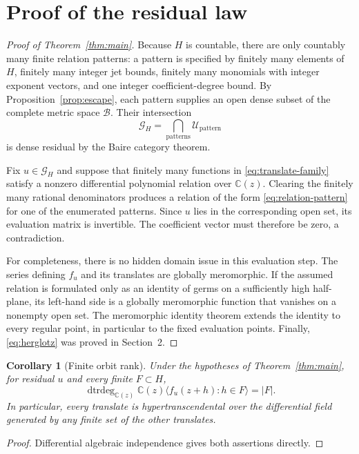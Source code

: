 \documentclass[11pt]{article}
\newtheorem{corollary}[theorem]{Corollary}
\newcommand{\C}{\mathbb C}
\newcommand{\cB}{\mathcal B}
\newcommand{\cG}{\mathcal G}
\newcommand{\cU}{\mathcal U}
\begin{document}
\section{Proof of the residual law}

\begin{proof}[Proof of Theorem~\ref{thm:main}]
Because $H$ is countable, there are only countably many finite relation patterns: a pattern is
specified by finitely many elements of $H$, finitely many integer jet bounds, finitely many
monomials with integer exponent vectors, and one integer coefficient-degree bound.  By
Proposition~\ref{prop:escape}, each pattern supplies an open dense subset of the complete metric
space $\cB$.  Their intersection
\[
  \cG_H=\bigcap_{\mathrm{patterns}}\cU_{\mathrm{pattern}}
\]
is dense residual by the Baire category theorem.

Fix $u\in\cG_H$ and suppose that finitely many functions in \eqref{eq:translate-family} satisfy a
nonzero differential polynomial relation over $\C(z)$.  Clearing the finitely many rational
denominators produces a relation of the form \eqref{eq:relation-pattern} for one of the enumerated
patterns.  Since $u$ lies in the corresponding open set, its evaluation matrix is invertible.
The coefficient vector must therefore be zero, a contradiction.

For completeness, there is no hidden domain issue in this evaluation step.  The series defining
$f_u$ and its translates are globally meromorphic.  If the assumed relation is formulated only
as an identity of germs on a sufficiently high half-plane, its left-hand side is a globally
meromorphic function that vanishes on a nonempty open set.  The meromorphic identity theorem
extends the identity to every regular point, in particular to the fixed evaluation points.
Finally, \eqref{eq:herglotz} was proved in Section~2.
\end{proof}

\begin{corollary}[Finite orbit rank]\label{cor:rank}
Under the hypotheses of Theorem~\ref{thm:main}, for residual $u$ and every finite
$F\subset H$,
\[
  \operatorname{dtrdeg}_{\C(z)}
  \C(z)\langle f_u(z+h):h\in F\rangle=|F|.
\]
In particular, every translate is hypertranscendental over the differential field generated by
any finite set of the other translates.
\end{corollary}

\begin{proof}
Differential algebraic independence gives both assertions directly.
\end{proof}
\end{document}
